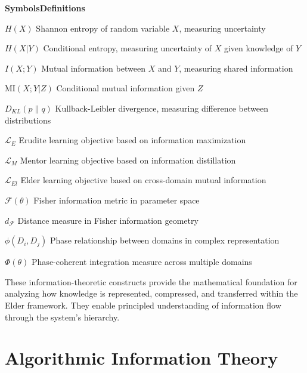 \begin{multicols}{2}
\noindent\textbf{\large Symbols}\hfill\textbf{\large Definitions}

\vspace{0.3cm}
\noindent$H(X)$ \dotfill Shannon entropy of random variable $X$, measuring uncertainty

\noindent$H(X|Y)$ \dotfill Conditional entropy, measuring uncertainty of $X$ given knowledge of $Y$

\noindent$I(X;Y)$ \dotfill Mutual information between $X$ and $Y$, measuring shared information

\noindent$\text{MI}(X;Y|Z)$ \dotfill Conditional mutual information given $Z$

\noindent$D_{KL}(p \| q)$ \dotfill Kullback-Leibler divergence, measuring difference between distributions

\noindent$\mathcal{L}_E$ \dotfill Erudite learning objective based on information maximization

\noindent$\mathcal{L}_M$ \dotfill Mentor learning objective based on information distillation

\noindent$\mathcal{L}_{El}$ \dotfill Elder learning objective based on cross-domain mutual information

\noindent$\mathcal{F}(\theta)$ \dotfill Fisher information metric in parameter space

\noindent$d_{\mathcal{F}}$ \dotfill Distance measure in Fisher information geometry

\noindent$\phi(D_i, D_j)$ \dotfill Phase relationship between domains in complex representation

\noindent$\Phi(\theta)$ \dotfill Phase-coherent integration measure across multiple domains
\end{multicols}

\vspace{1cm}
\begin{center}
These information-theoretic constructs provide the mathematical foundation for analyzing how knowledge is represented, compressed, and transferred within the Elder framework. They enable principled understanding of information flow through the system's hierarchy.
\end{center}

\clearpage
\chapter*{Algorithmic Information Theory}

